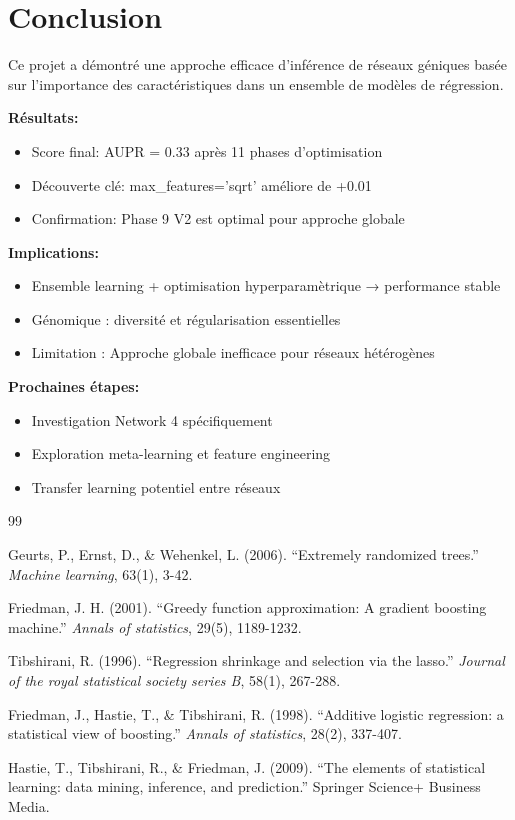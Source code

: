 \documentclass[12pt,a4paper,french]{article}
\begin{document}
\section*{Conclusion}

Ce projet a démontré une approche efficace d'inférence de réseaux géniques basée sur l'importance des caractéristiques dans un ensemble de modèles de régression. 

\textbf{Résultats:}
\begin{itemize}
    \item Score final: AUPR = 0.33 après 11 phases d'optimisation
    \item Découverte clé: max\_features='sqrt' améliore de +0.01
    \item Confirmation: Phase 9 V2 est optimal pour approche globale
\end{itemize}

\textbf{Implications:}
\begin{itemize}
    \item Ensemble learning + optimisation hyperparamètrique → performance stable
    \item Génomique : diversité et régularisation essentielles
    \item Limitation : Approche globale inefficace pour réseaux hétérogènes
\end{itemize}

\textbf{Prochaines étapes:}
\begin{itemize}
    \item Investigation Network 4 spécifiquement
    \item Exploration meta-learning et feature engineering
    \item Transfer learning potentiel entre réseaux
\end{itemize}

\newpage
\begin{thebibliography}{99}

Geurts, P., Ernst, D., \& Wehenkel, L. (2006).
``Extremely randomized trees.''
\textit{Machine learning}, 63(1), 3-42.

Friedman, J. H. (2001).
``Greedy function approximation: A gradient boosting machine.''
\textit{Annals of statistics}, 29(5), 1189-1232.

Tibshirani, R. (1996).
``Regression shrinkage and selection via the lasso.''
\textit{Journal of the royal statistical society series B}, 58(1), 267-288.

Friedman, J., Hastie, T., \& Tibshirani, R. (1998).
``Additive logistic regression: a statistical view of boosting.''
\textit{Annals of statistics}, 28(2), 337-407.

Hastie, T., Tibshirani, R., \& Friedman, J. (2009).
``The elements of statistical learning: data mining, inference, and prediction.''
Springer Science+ Business Media.

\end{thebibliography}
\end{document}
